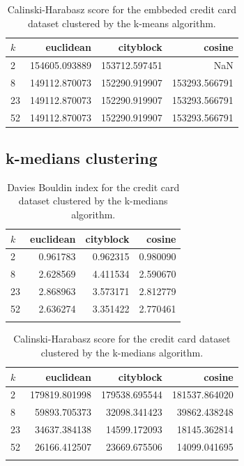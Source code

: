 \begin{table}[ht!]
    \centering
   \begin{tabular}{lrrr}
\toprule
$k$ &      euclidean &      cityblock &         cosine \\
\midrule
2  &  154605.093889 &  153712.597451 &            NaN \\
8  &  149112.870073 &  152290.919907 &  153293.566791 \\
23 &  149112.870073 &  152290.919907 &  153293.566791 \\
52 &  149112.870073 &  152290.919907 &  153293.566791 \\
\bottomrule
\end{tabular}
    \caption{Calinski-Harabasz score for the embbeded credit card dataset clustered by the k-means algorithm.}
    \label{tab:ce_ch_k}
\end{table}

\subsection{k-medians clustering}

\begin{table}[ht!]
    \centering
   \begin{tabular}{lrrr}
\toprule
$k$ &  euclidean &  cityblock &    cosine \\
\midrule
2  &   0.961783 &   0.962315 &  0.980090 \\
8  &   2.628569 &   4.411534 &  2.590670 \\
23 &   2.868963 &   3.573171 &  2.812779 \\
52 &   2.636274 &   3.351422 &  2.770461 \\
\bottomrule \\
\end{tabular}
    \caption{Davies Bouldin index for the credit card dataset clustered by the k-medians algorithm.}
    \label{tab:c1_db_km}
\end{table}

\begin{table}[ht!]
    \centering
    \begin{tabular}{lrrr}
\toprule
$k$ &      euclidean &      cityblock &         cosine \\
\midrule
2  &  179819.801998 &  179538.695544 &  181537.864020 \\
8  &   59893.705373 &   32098.341423 &   39862.438248 \\
23 &   34637.384138 &   14599.172093 &   18145.362814 \\
52 &   26166.412507 &   23669.675506 &   14099.041695 \\
\bottomrule \\
\end{tabular}
    \caption{Calinski-Harabasz score for the credit card dataset clustered by the k-medians algorithm.}
    \label{tab:c1_ch_km}
\end{table}

